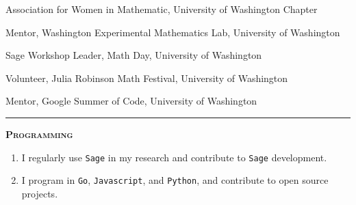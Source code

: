 \documentclass[12pt]{article}
\newcommand{\sectionheading}[1]
{
\bigskip %
\noindent
\hspace{-6.5mm}\textcolor{Gray}{\rule[.75mm]{21.5mm}{1mm}} %
\hspace{.2mm}	%
{\large{\textbf{\textsc{#1}}}} %
}
\newenvironment{date_section}
	{
	\vspace{-1ex}
	\leftmargini = 15ex
		\begin{itemize}[
			labelsep = *,
			labelwidth = 9ex,
			labelindent = 0ex,
			itemindent = !,
			font=\normalfont,
			align=parleft
		]{}
		\itemsep=-1.5mm
	}
	{\end{itemize}\vspace{-2ex}}
\newcommand{\yearmo}[2]{
	\item[
		{\makebox[1ex][r]{#1}}
		\hspace{1ex}
		{\makebox[1ex][l]{#2} }
		] }
\newcommand{\yearrange}[2]{
	\item[
		{\makebox[1ex][r]{#1}}
		--
		{\makebox[1ex][l]{#2} }
		] }
\begin{document}
		\begin{date_section}
			
			\yearrange{2015}{2018}
				Association for Women in Mathematic,
				University of Washington Chapter
			
			\yearrange{2016}{2017}
				Mentor,
				Washington Experimental Mathematics Lab,
				University of Washington
				
			\yearmo{}{2017} %
				Sage Workshop Leader,
				Math Day,
				University of Washington
				
			\yearmo{}{2017} %
				Volunteer,
				Julia Robinson Math Festival,
				University of Washington

			\yearmo{}{2016} %
				Mentor,
				Google Summer of Code,
				University of Washington

%			
%
%
%
%

		\end{date_section}


	\sectionheading{Programming}%
	
        \vspace{1ex}
        
        \begin{enumerate}[label=$\bullet$]
        	\item I regularly use {\tt Sage} in my research and contribute to {\tt Sage} development.
        	\item I program in {\tt Go}, {\tt Javascript}, and {\tt Python}, and contribute to open source projects. 
        \end{enumerate}

\end{document}
